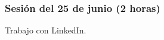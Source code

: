 \documentclass[a4paper,12pt]{article}
\begin{document}




\subsubsection{Sesión del 25 de junio (2 horas)}

Trabajo con LinkedIn.


\end{document}
